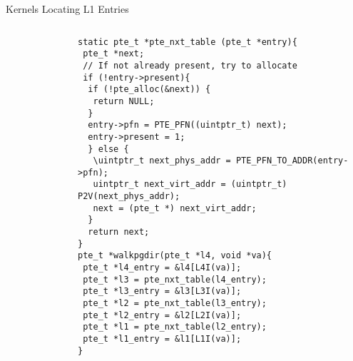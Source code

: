 \documentclass[aspectratio=169,xcolor=dvipsnames]{beamer}
\begin{document}
\begin{frame}[fragile]{Kernels Locating L1 Entries}
\begin{columns}[c]
\begin{figure}
\begin{tikzpicture}[x=0.75pt,y=0.75pt,yscale=-0.5,xscale=0.5]
\end{tikzpicture}
    \end{figure}
\begin{lstlisting}[style=CStyleNumEmph, basicstyle=\tiny]
static pte_t *pte_nxt_table (pte_t *entry){
 pte_t *next;
 // If not already present, try to allocate
 if (!entry->present){
  if (!pte_alloc(&next)) {
   return NULL;
  }
  entry->pfn = PTE_PFN((uintptr_t) next);
  entry->present = 1;
  } else {
   \uintptr_t next_phys_addr = PTE_PFN_TO_ADDR(entry->pfn);        
   uintptr_t next_virt_addr = (uintptr_t) P2V(next_phys_addr);
   next = (pte_t *) next_virt_addr;
  }
  return next;
}   
pte_t *walkpgdir(pte_t *l4, void *va){ 
 pte_t *l4_entry = &l4[L4I(va)];
 pte_t *l3 = pte_nxt_table(l4_entry);
 pte_t *l3_entry = &l3[L3I(va)];
 pte_t *l2 = pte_nxt_table(l3_entry);
 pte_t *l2_entry = &l2[L2I(va)];  
 pte_t *l1 = pte_nxt_table(l2_entry);
 pte_t *l1_entry = &l1[L1I(va)];  
}
\end{lstlisting}
\end{columns}
\end{frame}
\end{document}
